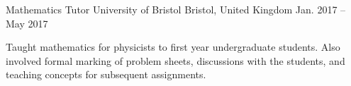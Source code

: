 
\begin{cventries}

\iffalse
    \cventry
      {Computing Demonstrator} %
      {University of Bristol} %
      {Bristol, United Kingdom} %
      {Nov. 2019 -- Present} %
      {
        \begin{cvitems} %
          \item{Teaching third year undergraduate students Python and its applications for numerically solving physics problems. Also involves formal marking of assignments and providing feedback.}
        \end{cvitems}
      }
\fi

    \cventry
      {Mathematics Tutor} %
      {University of Bristol} %
      {Bristol, United Kingdom} %
      {Jan. 2017 -- May 2017} %
      {
        \begin{cvitems} %
          \item{Taught mathematics for physicists to first year undergraduate students. Also involved formal marking of problem sheets, discussions with the students, and teaching concepts for subsequent assignments.}
        \end{cvitems}
      }

\end{cventries}
